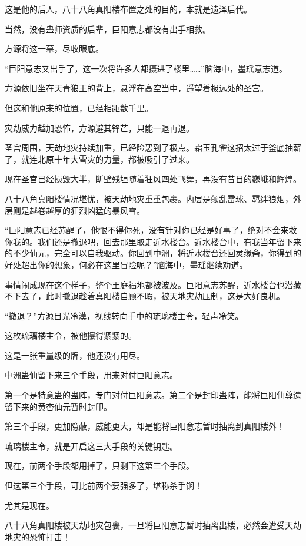\begin{this_body}
这是他的后人，八十八角真阳楼布置之处的目的，本就是遗泽后代。

当然，没有蛊师资质的后辈，巨阳意志都没有出手相救。

方源将这一幕，尽收眼底。

“巨阳意志又出手了，这一次将许多人都摄进了楼里……”脑海中，墨瑶意志道。

方源依旧坐在天青狼王的背上，悬浮在高空当中，遥望着极远处的圣宫。

但这和他原来的位置，已经相距数千里。

灾劫威力越加恐怖，方源避其锋芒，只能一退再退。

圣宫周围，天劫地灾持续加重，已经险恶到了极点。霜玉孔雀这招太过于釜底抽薪了，就连北原十年大雪灾的力量，都被吸引了过来。

现在圣宫已经损毁大半，断壁残垣随着狂风四处飞舞，再没有昔日的巍峨和辉煌。

八十八角真阳楼情况堪忧，被天劫地灾重重包裹。内层是颠乱雷球、羁绊狼烟，外层则是越卷越厚的狂烈凶猛的暴风雪。

“巨阳意志已经苏醒了，他恨不得你死，没有针对你已经是好事了，绝对不会来救你我的。我们还是撤退吧，回去那里取走近水楼台。近水楼台中，有我当年留下来的不少仙元，完全可以自我驱动。你回到中洲，将近水楼台还回灵缘斋，你得到的好处超出你的想象，何必在这里冒险呢？”脑海中，墨瑶继续劝道。

事情闹成现在这个样子，整个王庭福地都被波及。巨阳意志苏醒，近水楼台也潜藏不下去了，此时撤退趁着真阳楼自顾不暇，被天地灾劫压制，这是大好良机。

“撤退？”方源目光冷漠，视线转向手中的琉璃楼主令，轻声冷笑。

这枚琉璃楼主令，被他攥得紧紧的。

这是一张重量级的牌，他还没有用尽。

中洲蛊仙留下来三个手段，用来对付巨阳意志。

第一个是特意蛊的蛊阵，专门对付巨阳意志。第二个是封印蛊阵，能将巨阳仙尊遗留下来的黄杏仙元暂时封印。

第三个手段，更加隐蔽，威能更大，却是能将巨阳意志暂时抽离到真阳楼外！

琉璃楼主令，就是开启这三大手段的关键钥匙。

现在，前两个手段都用掉了，只剩下这第三个手段。

但这第三个手段，可比前两个要强多了，堪称杀手锏！

尤其是现在。

八十八角真阳楼被天劫地灾包裹，一旦将巨阳意志暂时抽离出楼，必然会遭受天劫地灾的恐怖打击！


\end{this_body}
